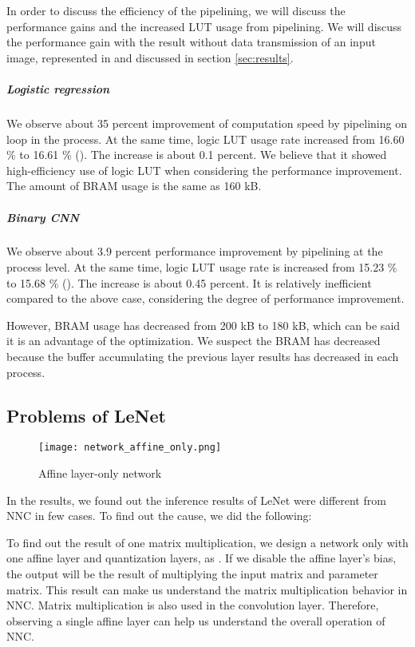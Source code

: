 In order to discuss the efficiency of the pipelining, we will discuss the performance gains and the increased LUT usage from pipelining. We will discuss the performance gain with the result without data transmission of an input image, represented in  and discussed in section \ref{sec:results}.

\subparagraph{Logistic regression}
We observe about 35 percent improvement of computation speed by pipelining on loop in the process. At the same time, logic LUT usage rate increased from 16.60 \% to 16.61 \% (). The increase is about 0.1 percent. We believe that it showed high-efficiency use of logic LUT when considering the performance improvement. The amount of BRAM usage is the same as 160 kB.

\subparagraph{Binary CNN}
We observe about 3.9 percent performance improvement by pipelining at the process level. At the same time, logic LUT usage rate is increased from 15.23 \% to 15.68 \% (). The increase is about 0.45 percent. It is relatively inefficient compared to the above case, considering the degree of performance improvement.

However, BRAM usage has decreased from 200 kB to 180 kB, which can be said it is an advantage of the optimization. We suspect the BRAM has decreased because the buffer accumulating the previous layer results has decreased in each process.

\subsection{Problems of LeNet}

\begin{figure}[tbp]
  \centering
  \texttt{[image: network\_affine\_only.png]}
  \caption{Affine layer-only network}%
  \label{fig:network_affine}
\end{figure}
In the results, we found out the inference results of LeNet were different from NNC in few cases. To find out the cause, we did the following:

To find out the result of one matrix multiplication, we design a network only with one affine layer and quantization layers, as . If we disable the affine layer's bias, the output will be the result of multiplying the input matrix and parameter matrix. This result can make us understand the matrix multiplication behavior in NNC. Matrix multiplication is also used in the convolution layer. Therefore, observing a single affine layer can help us understand the overall operation of NNC.



